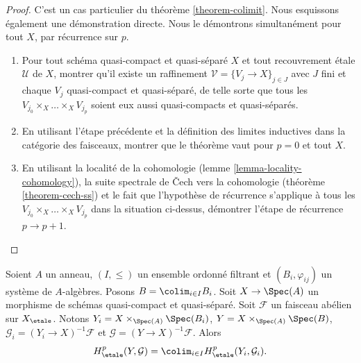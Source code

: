 \begin{proof}
C'est un cas particulier du th\'eor\`eme \ref{theorem-colimit}.
Nous esquissons \'egalement une d\'emonstration directe.
Nous le d\'emontrons simultan\'ement pour tout $X$, par r\'ecurrence sur $p$.
\begin{enumerate}
\item
Pour tout sch\'ema quasi-compact et quasi-s\'epar\'e $X$ et tout recouvrement \'etale
$\mathcal{U}$ de $X$, montrer qu'il existe un raffinement
$\mathcal{V} = \{V_j \to X\}_{j\in J}$ avec $J$ fini et chaque $V_j$
quasi-compact et quasi-s\'epar\'e, de telle sorte que tous les
$V_{j_0} \times_X \ldots \times_X V_{j_p}$ soient eux aussi
quasi-compacts et quasi-s\'epar\'es.
\item
En utilisant l'\'etape pr\'ec\'edente et la d\'efinition des limites inductives dans la cat\'egorie des
faisceaux, montrer que le th\'eor\`eme vaut pour $p = 0$ et tout $X$.
\item
En utilisant la localit\'e de la cohomologie
(lemme \ref{lemma-locality-cohomology}),
la suite spectrale de {\v C}ech vers la cohomologie
(th\'eor\`eme \ref{theorem-cech-ss}) et le fait que l'hypoth\`ese de r\'ecurrence
s'applique \`a tous les
$V_{j_0} \times_X \ldots \times_X V_{j_p}$
dans la situation ci-dessus, d\'emontrer l'\'etape de r\'ecurrence $p \to p + 1$.
\end{enumerate}
\end{proof}

\begin{lemma}
\label{lemma-directed-colimit-cohomology}
Soient $A$ un anneau, $(I, \leq)$ un ensemble ordonn\'e filtrant et $(B_i, \varphi_{ij})$ un
syst\`eme de $A$-alg\`ebres. Posons $B = \colim_{i\in I} B_i$. Soit $X \to \Spec(A)$
un morphisme de sch\'emas quasi-compact et quasi-s\'epar\'e. Soit
$\mathcal{F}$ un faisceau ab\'elien sur $X_\etale$.
Notons $Y_i = X \times_{\Spec(A)} \Spec(B_i)$,
$Y = X \times_{\Spec(A)} \Spec(B)$,
$\mathcal{G}_i = (Y_i \to X)^{-1}\mathcal{F}$ et
$\mathcal{G} = (Y \to X)^{-1}\mathcal{F}$. Alors
$$
H_\etale^p(Y, \mathcal{G}) =
\colim_{i\in I} H_\etale^p (Y_i, \mathcal{G}_i).
$$
\end{lemma}

